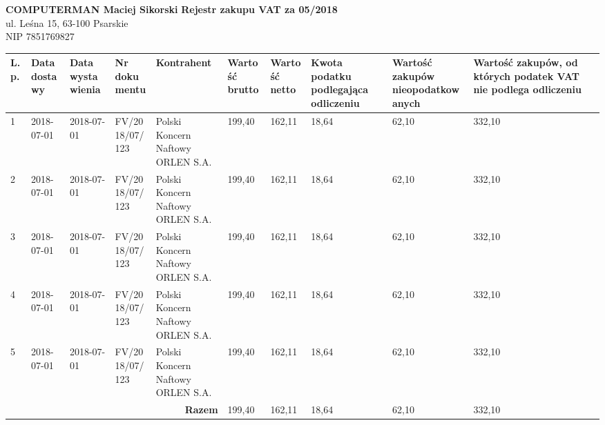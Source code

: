 \documentclass[a4paper,10pt,landscape]{article}
\date{}
\begin{document}
	
\noindent
\textbf{COMPUTERMAN Maciej Sikorski} \hfill \textbf{\huge{Rejestr zakupu VAT za 05/2018}}\\
ul. Leśna 15, 63-100 Psarskie\\							
NIP 7851769827\\		

\begin{table}[H]
		\raggedleft
	\begin{tabular}{| p{} | p{2cm}  | p{2cm} | p{3cm}| p{4cm} | p{} | p{} | p{2cm} | p{2cm} |p{3cm} |}
		\hline
		\textbf{L.p.} & \textbf{Data dostawy} & \textbf{Data wystawienia} & \textbf{Nr dokumentu} & \textbf{Kontrahent} & \textbf{Wartość brutto} & \textbf{Wartość netto} & \textbf{Kwota podatku podlegająca odliczeniu} & \textbf{Wartość zakupów nieopodatkowanych} & \textbf{Wartość zakupów, od których podatek VAT nie podlega odliczeniu} \\ \hline
		1 & 2018-07-01 & 2018-07-01 & FV/2018/07/123 & Polski Koncern Naftowy ORLEN S.A. & 199,40 & 162,11 & 18,64 & 62,10 & 332,10 \\ \hline
				2 & 2018-07-01 & 2018-07-01 & FV/2018/07/123 & Polski Koncern Naftowy ORLEN S.A. & 199,40 & 162,11 & 18,64 & 62,10 & 332,10 \\ \hline
						3 & 2018-07-01 & 2018-07-01 & FV/2018/07/123 & Polski Koncern Naftowy ORLEN S.A. & 199,40 & 162,11 & 18,64 & 62,10 & 332,10 \\ \hline
								4 & 2018-07-01 & 2018-07-01 & FV/2018/07/123 & Polski Koncern Naftowy ORLEN S.A. & 199,40 & 162,11 & 18,64 & 62,10 & 332,10 \\ \hline
										5 & 2018-07-01 & 2018-07-01 & FV/2018/07/123 & Polski Koncern Naftowy ORLEN S.A. & 199,40 & 162,11 & 18,64 & 62,10 & 332,10 \\ \hline
										  \multicolumn{5}{|r|}{\textbf{Razem}} & 199,40 & 162,11 & 18,64 & 62,10 & 332,10 \\ \hline
	\end{tabular}
\end{table}

\end{document}
